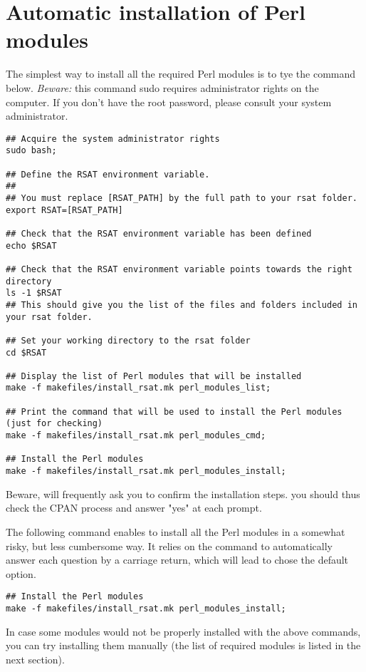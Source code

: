 \documentclass[12pt,a4paper, oneside]{scrreprt} %
\begin{document}
\section{Automatic installation of Perl modules}

The simplest way to install all the required Perl modules is to tye
the command below. \emph{Beware:} this command sudo requires
administrator rights on the computer. If you don't have the root
password, please consult your system administrator.

\begin{lstlisting}
## Acquire the system administrator rights
sudo bash;

## Define the RSAT environment variable.
##
## You must replace [RSAT_PATH] by the full path to your rsat folder.
export RSAT=[RSAT_PATH]

## Check that the RSAT environment variable has been defined
echo $RSAT

## Check that the RSAT environment variable points towards the right directory
ls -1 $RSAT
## This should give you the list of the files and folders included in your rsat folder.

## Set your working directory to the rsat folder
cd $RSAT

## Display the list of Perl modules that will be installed
make -f makefiles/install_rsat.mk perl_modules_list;

## Print the command that will be used to install the Perl modules (just for checking)
make -f makefiles/install_rsat.mk perl_modules_cmd;

## Install the Perl modules
make -f makefiles/install_rsat.mk perl_modules_install;
\end{lstlisting}

Beware,  will frequently ask you to confirm the
installation steps. you should thus check the CPAN process and answer
"yes" at each prompt.

The following command enables to install all the Perl modules in a
somewhat risky, but less cumbersome way. It relies on the command
 to automatically answer each question by a carriage
return, which will lead  to chose the default option.

\begin{lstlisting}
## Install the Perl modules
make -f makefiles/install_rsat.mk perl_modules_install;
\end{lstlisting}

In case some modules would not be properly installed with the above
commands, you can try installing them manually (the list of required
modules is listed in the next section).
\end{document}

